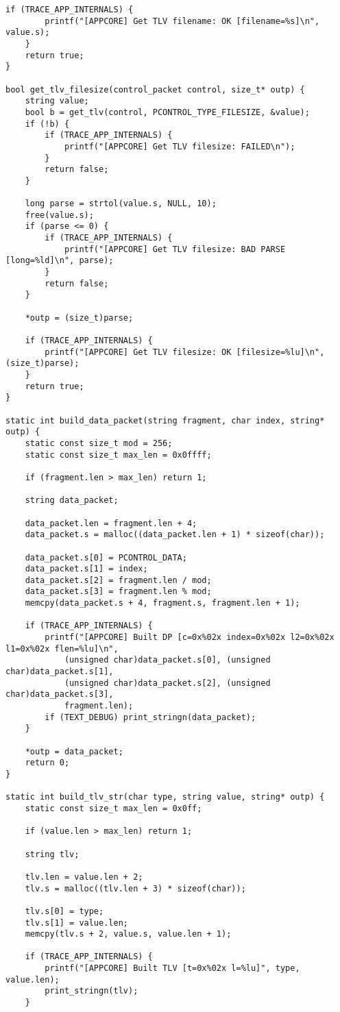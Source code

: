 \documentclass[subfiles]{main.tex}
\begin{document}
\begin{lstlisting}[style=rcom]
	if (TRACE_APP_INTERNALS) {
		printf("[APPCORE] Get TLV filename: OK [filename=%s]\n", value.s);
	}
	return true;
}

bool get_tlv_filesize(control_packet control, size_t* outp) {
	string value;
	bool b = get_tlv(control, PCONTROL_TYPE_FILESIZE, &value);
	if (!b) {
		if (TRACE_APP_INTERNALS) {
			printf("[APPCORE] Get TLV filesize: FAILED\n");
		}
		return false;
	}
	
	long parse = strtol(value.s, NULL, 10);
	free(value.s);
	if (parse <= 0) {
		if (TRACE_APP_INTERNALS) {
			printf("[APPCORE] Get TLV filesize: BAD PARSE [long=%ld]\n", parse);
		}
		return false;
	}
	
	*outp = (size_t)parse;
	
	if (TRACE_APP_INTERNALS) {
		printf("[APPCORE] Get TLV filesize: OK [filesize=%lu]\n", (size_t)parse);
	}
	return true;
}

static int build_data_packet(string fragment, char index, string* outp) {
	static const size_t mod = 256;
	static const size_t max_len = 0x0ffff;
	
	if (fragment.len > max_len) return 1;
	
	string data_packet;
	
	data_packet.len = fragment.len + 4;
	data_packet.s = malloc((data_packet.len + 1) * sizeof(char));
	
	data_packet.s[0] = PCONTROL_DATA;
	data_packet.s[1] = index;
	data_packet.s[2] = fragment.len / mod;
	data_packet.s[3] = fragment.len % mod;
	memcpy(data_packet.s + 4, fragment.s, fragment.len + 1);
	
	if (TRACE_APP_INTERNALS) {
		printf("[APPCORE] Built DP [c=0x%02x index=0x%02x l2=0x%02x l1=0x%02x flen=%lu]\n",
			(unsigned char)data_packet.s[0], (unsigned char)data_packet.s[1],
			(unsigned char)data_packet.s[2], (unsigned char)data_packet.s[3],
			fragment.len);
		if (TEXT_DEBUG) print_stringn(data_packet);
	}
	
	*outp = data_packet;
	return 0;
}

static int build_tlv_str(char type, string value, string* outp) {
	static const size_t max_len = 0x0ff;
	
	if (value.len > max_len) return 1;
	
	string tlv;
	
	tlv.len = value.len + 2;
	tlv.s = malloc((tlv.len + 3) * sizeof(char));
	
	tlv.s[0] = type;
	tlv.s[1] = value.len;
	memcpy(tlv.s + 2, value.s, value.len + 1);
	
	if (TRACE_APP_INTERNALS) {
		printf("[APPCORE] Built TLV [t=0x%02x l=%lu]", type, value.len);
		print_stringn(tlv);
	}
	

\end{lstlisting}
\end{document}
